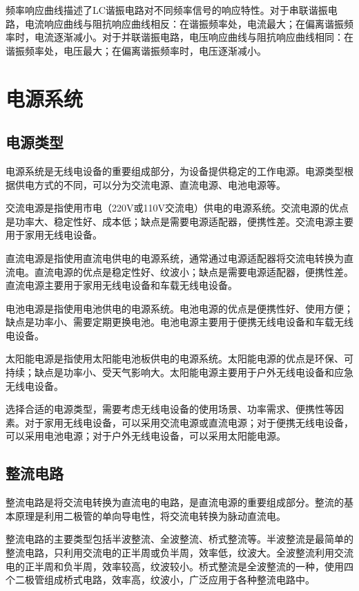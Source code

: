 \documentclass[12pt,UTF8]{ctexbook}
\begin{document}
频率响应曲线描述了LC谐振电路对不同频率信号的响应特性。对于串联谐振电路，电流响应曲线与阻抗响应曲线相反：在谐振频率处，电流最大；在偏离谐振频率时，电流逐渐减小。对于并联谐振电路，电压响应曲线与阻抗响应曲线相同：在谐振频率处，电压最大；在偏离谐振频率时，电压逐渐减小。

\chapter{电源系统}

\section{电源类型}

电源系统是无线电设备的重要组成部分，为设备提供稳定的工作电源。电源类型根据供电方式的不同，可以分为交流电源、直流电源、电池电源等。

交流电源是指使用市电（220V或110V交流电）供电的电源系统。交流电源的优点是功率大、稳定性好、成本低；缺点是需要电源适配器，便携性差。交流电源主要用于家用无线电设备。

直流电源是指使用直流电供电的电源系统，通常通过电源适配器将交流电转换为直流电。直流电源的优点是稳定性好、纹波小；缺点是需要电源适配器，便携性差。直流电源主要用于家用无线电设备和车载无线电设备。

电池电源是指使用电池供电的电源系统。电池电源的优点是便携性好、使用方便；缺点是功率小、需要定期更换电池。电池电源主要用于便携无线电设备和车载无线电设备。

太阳能电源是指使用太阳能电池板供电的电源系统。太阳能电源的优点是环保、可持续；缺点是功率小、受天气影响大。太阳能电源主要用于户外无线电设备和应急无线电设备。

选择合适的电源类型，需要考虑无线电设备的使用场景、功率需求、便携性等因素。对于家用无线电设备，可以采用交流电源或直流电源；对于便携无线电设备，可以采用电池电源；对于户外无线电设备，可以采用太阳能电源。

\section{整流电路}

整流电路是将交流电转换为直流电的电路，是直流电源的重要组成部分。整流的基本原理是利用二极管的单向导电性，将交流电转换为脉动直流电。

整流电路的主要类型包括半波整流、全波整流、桥式整流等。半波整流是最简单的整流电路，只利用交流电的正半周或负半周，效率低，纹波大。全波整流利用交流电的正半周和负半周，效率较高，纹波较小。桥式整流是全波整流的一种，使用四个二极管组成桥式电路，效率高，纹波小，广泛应用于各种整流电路中。
\end{document}
